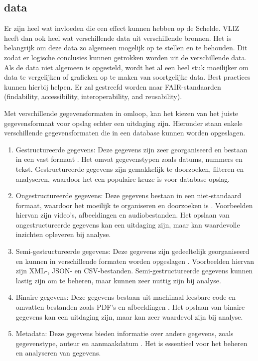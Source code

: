 \subsection{data}
Er zijn heel wat invloeden die een effect kunnen hebben op de Schelde. VLIZ heeft dan ook heel wat verschillende data uit verschillende bronnen. Het is belangrijk om deze data zo algemeen mogelijk op te stellen en te behouden. Dit zodat er logische conclusies kunnen getrokken worden uit de verschillende data. Als de data niet algemeen is opgesteld, wordt het al een heel stuk moeilijker om data te vergelijken of grafieken op te maken van soortgelijke data. Best practices kunnen hierbij helpen. Er zal gestreefd worden naar FAIR-standaarden (findability, accessibility, interoperability, and reusability). 

Met verschillende gegevensformaten in omloop, kan het kiezen van het juiste gegevensformaat voor opslag echter een uitdaging zijn. Hieronder staan enkele verschillende gegevensformaten die in een database kunnen worden opgeslagen.

\begin{enumerate}
    \item Gestructureerde gegevens: Deze gegevens zijn zeer georganiseerd en bestaan in een vast formaat \autocite{Dantoni2022}. Het omvat gegevenstypen zoals datums, nummers en tekst. Gestructureerde gegevens zijn gemakkelijk te doorzoeken, filteren en analyseren, waardoor het een populaire keuze is voor database-opslag.
    
    \item Ongestructureerde gegevens: Deze gegevens bestaan in een niet-standaard formaat, waardoor het moeilijk te organiseren en doorzoeken is \autocite{IBMCloudEducation2021}. Voorbeelden hiervan zijn video's, afbeeldingen en audiobestanden. Het opslaan van ongestructureerde gegevens kan een uitdaging zijn, maar kan waardevolle inzichten opleveren bij analyse.
    
    \item Semi-gestructureerde gegevens: Deze gegevens zijn gedeeltelijk georganiseerd en kunnen in verschillende formaten worden opgeslagen \autocite{ihritik2021}. Voorbeelden hiervan zijn XML-, JSON- en CSV-bestanden. Semi-gestructureerde gegevens kunnen lastig zijn om te beheren, maar kunnen zeer nuttig zijn bij analyse.
    
    \item Binaire gegevens: Deze gegevens bestaan uit machinaal leesbare code en omvatten bestanden zoals PDF's en afbeeldingen \autocite{Heddings2018}. Het opslaan van binaire gegevens kan een uitdaging zijn, maar kan zeer waardevol zijn bij analyse.
    
    \item Metadata: Deze gegevens bieden informatie over andere gegevens, zoals gegevenstype, auteur en aanmaakdatum  \autocite{TECHOPEDIA2017}. Het is essentieel voor het beheren en analyseren van gegevens.
\end{enumerate}

